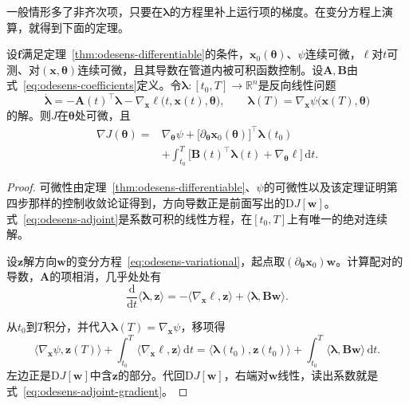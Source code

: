 一般情形多了非齐次项，只要在$\bm{\lambda}$的方程里补上运行项的梯度。在变分方程上演算，就得到下面的定理。

\begin{theorem}[伴随表示]
\label{thm:odesens-adjoint}
设$\bm{f}$满足定理~\ref{thm:odesens-differentiable}的条件，$\bm{x}_0(\bm{\theta})$、$\psi$连续可微，$\ell$对$t$可测、对$(\bm{x},\bm{\theta})$连续可微，且其导数在管道内被可积函数控制。设$\bm{A},\bm{B}$由式~\eqref{eq:odesens-coefficients}定义。令$\bm{\lambda}:[t_0,T]\to\mathbb{R}^{n}$是反向线性问题
\begin{equation}
 \dot{\bm{\lambda}}=-\bm{A}(t)^{\top}\bm{\lambda}-\nabla_{\bm{x}}\ell\bigl(t,\bm{x}(t),\bm{\theta}\bigr),\qquad
 \bm{\lambda}(T)=\nabla_{\bm{x}}\psi\bigl(\bm{x}(T),\bm{\theta}\bigr)
 \label{eq:odesens-adjoint}
\end{equation}
的解。则$J$在$\bm{\theta}$处可微，且
\begin{equation}
 \begin{aligned}
 \nabla J(\bm{\theta})={}&\nabla_{\bm{\theta}}\psi+\bigl[\partial_{\bm{\theta}}\bm{x}_0(\bm{\theta})\bigr]^{\top}\bm{\lambda}(t_0)\\
 &+\int_{t_0}^{T}\bigl[\bm{B}(t)^{\top}\bm{\lambda}(t)+\nabla_{\bm{\theta}}\ell\bigr]\,\mathrm{d}t.
 \end{aligned}
 \label{eq:odesens-adjoint-gradient}
\end{equation}
\end{theorem}

\begin{proof}
可微性由定理~\ref{thm:odesens-differentiable}、$\psi$的可微性以及该定理证明第四步那样的控制收敛论证得到，方向导数正是前面写出的$\mathrm{D}J[\bm{w}]$。式~\eqref{eq:odesens-adjoint}是系数可积的线性方程，在$[t_0,T]$上有唯一的绝对连续解。

设$\bm{z}$解方向$\bm{w}$的变分方程~\eqref{eq:odesens-variational}，起点取$(\partial_{\bm{\theta}}\bm{x}_0)\bm{w}$。计算配对的导数，$\bm{A}$的项相消，几乎处处有
\[
 \frac{\mathrm{d}}{\mathrm{d}t}\langle\bm{\lambda},\bm{z}\rangle=-\langle\nabla_{\bm{x}}\ell,\bm{z}\rangle+\langle\bm{\lambda},\bm{B}\bm{w}\rangle.
\]

从$t_0$到$T$积分，并代入$\bm{\lambda}(T)=\nabla_{\bm{x}}\psi$，移项得
\[
 \langle\nabla_{\bm{x}}\psi,\bm{z}(T)\rangle+\int_{t_0}^{T}\langle\nabla_{\bm{x}}\ell,\bm{z}\rangle\,\mathrm{d}t=\langle\bm{\lambda}(t_0),\bm{z}(t_0)\rangle+\int_{t_0}^{T}\langle\bm{\lambda},\bm{B}\bm{w}\rangle\,\mathrm{d}t.
\]
左边正是$\mathrm{D}J[\bm{w}]$中含$\bm{z}$的部分。代回$\mathrm{D}J[\bm{w}]$，右端对$\bm{w}$线性，读出系数就是式~\eqref{eq:odesens-adjoint-gradient}。
\end{proof}

